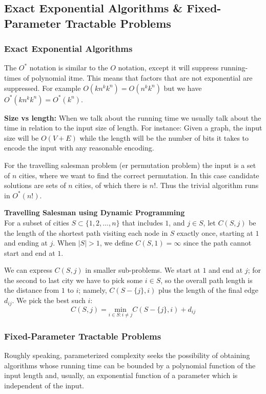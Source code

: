 \subsection{Exact Exponential Algorithms \& Fixed-Parameter Tractable Problems}

\subsubsection{Exact Exponential Algorithms}
The $O^*$ notation is similar to the $O$ notation, except it will suppress
running-times of polynomial itme. This means that factors that are not
exponential are suppressed. For example $O(kn^kk^n) = O(n^kk^n)$ but we have
$O^*(kn^kk^n) = O^*(k^n)$.

\noindent \textbf{Size vs length:} When we talk about the running time we usually talk about
the time in relation to the input size of length. For instance: Given a graph, the input size
will be $O(V + E)$ while the length will be the number of bits it takes to encode the input with any reasonable encoding.

For the travelling salesman problem (er permutation problem) the input is a set of $n$ cities, where we want to find
the correct permutation. In this case candidate solutions are sets of $n$ cities, of which there is $n!$. Thus
the trivial algorithm runs in $O^*(n!)$.

\noindent \textbf{Travelling Salesman using Dynamic Programming} \\
For a subset of cities $S \subset \{1,2,...,n\}$ that includes $1$, and $j \in S$, let $C(S,j)$ be
the length of the shortest path visiting each node in $S$ exactly once, starting at $1$ and ending at $j$.
When $|S| > 1$, we define $C(S,1) = \infty$ since the path cannot start and end at $1$.

We can express $C(S,j)$ in smaller sub-problems. We start at $1$ and end at $j$; for the second to last
city we have to pick some $i \in S$, so the overall path length is the distance from $1$ to $i$; namely,
$C(S-\{j\},i)$ plus the length of the final edge $d_{ij}$. We pick the best such $i$:
\[
  C(S,j) = \underset{i\in S:i\neq j}{\text{min}} C(S-\{j\},i)+d_{ij}
\]




\subsubsection{Fixed-Parameter Tractable Problems}
Roughly speaking, parameterized complexity seeks the possibility of obtaining
algorithms whose running time can be bounded by a polynomial function of the
input length and, usually, an exponential function of a parameter which is independent of the input.

